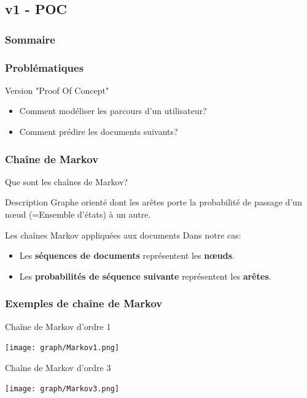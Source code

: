 \documentclass{beamer}
\begin{document}
        \subsection{v1 - POC}
            \begin{frame}
                \frametitle{Sommaire}
            \end{frame}
            \begin{frame}
            \frametitle{Problématiques}
            Version "Proof Of Concept"
            \begin{itemize}
            \pause
            \item Comment modéliser les parcours d'un utilisateur?
            \pause
            \item Comment prédire les documents suivants?
            \end{itemize}
            \end{frame}
            \begin{frame}
            \frametitle{Chaîne de Markov}
            Que sont les chaînes de Markov?
            \pause
            \begin{block}{Description}
            Graphe orienté dont les arêtes porte la probabilité de passage d'un nœud (=Ensemble d'états) à un autre.
            \end{block}
            \pause
            \begin{block}{Les chaînes Markov appliquées aux documents}
            Dans notre cas:
            \begin{itemize}
            \item Les \textbf{séquences de documents} représentent les \textbf{nœuds}.
            \item Les \textbf{probabilités de séquence suivante} représentent les \textbf{arêtes}.
            \end{itemize}
            \end{block}
            \end{frame}
            \begin{frame}
            \frametitle{Exemples de chaîne de Markov}
            \pause
            \begin{exampleblock}{Chaîne de Markov d'ordre 1}
            \begin{center}
            \texttt{[image: graph/Markov1.png]}
            \end{center}
            \end{exampleblock}
            \pause
            \begin{exampleblock}{Chaîne de Markov d'ordre 3}
            \begin{center}
            \texttt{[image: graph/Markov3.png]}
            \end{center}
            \end{exampleblock}
            \end{frame}
\end{document}

